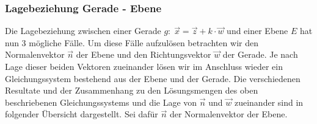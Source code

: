 \documentclass[a4paper,12pt]{article}
\begin{document}
	\subsubsection{Lagebeziehung Gerade - Ebene}
	Die Lagebeziehung zwischen einer Gerade $g:\; \vec{x}= \vec{z} + k \cdot \vec{w}$ 
	und einer Ebene $E$ 
	hat nun 3 mögliche Fälle. Um diese Fälle aufzulösen betrachten wir den Normalenvektor $\vec{n}$
	der Ebene und den Richtungsvektor $\vec{w}$ der Gerade. Je nach Lage dieser beiden Vektoren zueinander 
	lösen wir im Anschluss  wieder ein Gleichungssystem bestehend aus der Ebene und der 
	Gerade.	Die verschiedenen Resultate und der Zusammenhang zu den Lösungsmengen des oben beschriebenen 
	Gleichungssystems und die Lage von $\vec{n}$ und $\vec{w}$ zueinander 
	sind in folgender Übersicht dargestellt. Sei dafür $\vec{n}$ der Normalenvektor der Ebene.
\end{document}
